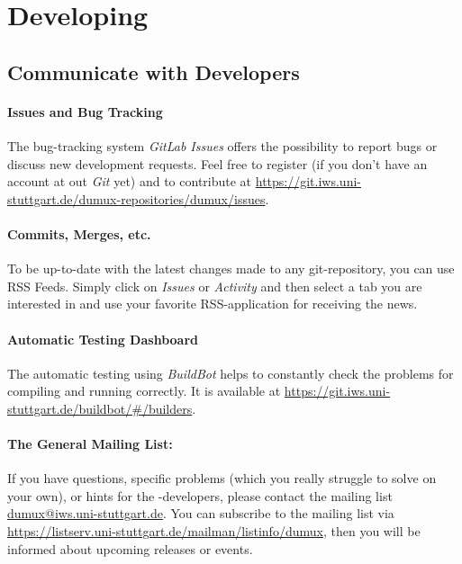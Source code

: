 
\section{Developing \Dumux}
\label{sc_developingdumux}

\subsection{Communicate with \Dumux Developers}

\paragraph{Issues and Bug Tracking}
The bug-tracking system \emph{GitLab Issues} offers the possibility to report bugs or discuss new development requests.
Feel free to register (if you don't have an account at out \emph{Git} yet) and to contribute
at \url{https://git.iws.uni-stuttgart.de/dumux-repositories/dumux/issues}.

\paragraph{Commits, Merges, etc.}
To be up-to-date with the latest changes made to any git-repository, you can use RSS Feeds.
Simply click on \emph{Issues} or \emph{Activity} and then select a tab you are interested in
and use your favorite RSS-application for receiving the news.

\paragraph{Automatic Testing Dashboard}
The automatic testing using \emph{BuildBot} helps to constantly check the
\Dumux problems for compiling and running correctly. It is available at
\url{https://git.iws.uni-stuttgart.de/buildbot/#/builders}.

\paragraph{The General Mailing List:}
If you have questions, specific problems (which you really struggle to solve on your own),
or hints for the \Dumux-developers, please contact the mailing list \url{dumux@iws.uni-stuttgart.de}.
You can subscribe to the mailing list via
\url{https://listserv.uni-stuttgart.de/mailman/listinfo/dumux}, then you
will be informed about upcoming releases or events.

